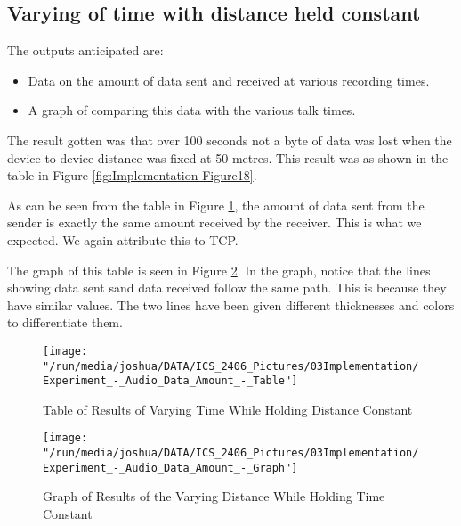 \documentclass[12pt,svgnames,smaller]{article} %
\begin{document}
	
	
	\subsection{Varying of time with distance held constant}
		
			The outputs anticipated are:
			
			\begin{itemize}
				\item Data on the amount of data sent and received at various recording times.
				\item A graph of comparing this data with the various talk times.
			\end{itemize}
				
	The result gotten was that over 100 seconds not a byte of data was lost when the device-to-device distance was fixed at 50 metres. This result was as shown in the table in Figure \ref{fig:Implementation-Figure18}.
	
	As can be seen from the table in Figure \ref{fig:Implementation-Figure19}, the amount of data sent from the sender is exactly the same amount received by the receiver. This is what we expected. We again attribute this to TCP. 
	
	The graph of this table is seen in Figure \ref{fig:Implementation-Figure20}. In the graph, notice that the lines showing data sent sand data received follow the same path. This is because they have similar values. The two lines have been given different thicknesses and colors to differentiate them.
	
	\begin{figure}
		\centering
		\texttt{[image: "/run/media/joshua/DATA/ICS\_2406\_Pictures/03Implementation/Experiment\_-\_Audio\_Data\_Amount\_-\_Table"]}
		\caption{Table of Results of Varying Time While Holding Distance Constant}
		\label{fig:Implementation-Figure19}			
	\end{figure} 
	
	\begin{figure}
		\centering
		\texttt{[image: "/run/media/joshua/DATA/ICS\_2406\_Pictures/03Implementation/Experiment\_-\_Audio\_Data\_Amount\_-\_Graph"]}
		\caption{Graph of Results of the Varying Distance While Holding Time Constant}
		\label{fig:Implementation-Figure20}			
	\end{figure} 
	
\end{document}
